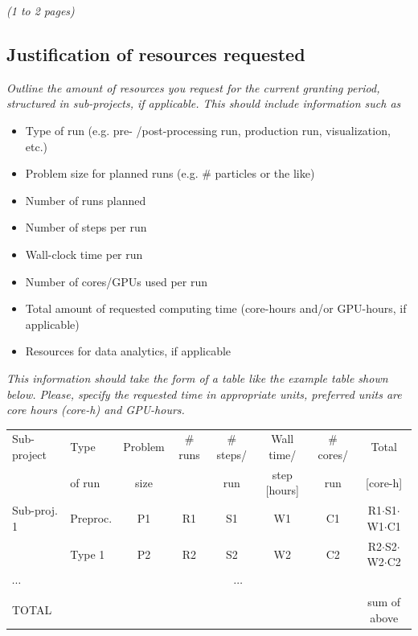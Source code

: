 \documentclass [a4paper, 12pt]{article}
\begin{document}
\textit{(1 to 2 pages)}
\newpage
\subsection{Justification of resources requested}
\textit{Outline the amount of resources you request for the current granting period, structured in sub-projects, if applicable. This should include information such as}
\begin{itshape}
\begin{itemize}\setlength{\itemsep}{-2pt}
    \item Type of run (e.g. pre- /post-processing run, production run, visualization, etc.)
    \item Problem size for planned runs (e.g. \# particles or the like)
    \item Number of runs planned
    \item Number of steps per run
    \item Wall-clock time per run
    \item Number of cores/GPUs used per run
    \item Total amount of requested computing time (core-hours and/or GPU-hours, if applicable)
    \item Resources for data analytics, if applicable
\end{itemize}
\end{itshape}
\textit{This information should take the form of a table like the example table shown below. Please, specify the requested time in appropriate units, preferred units are core hours (core-h) and GPU-hours.}\\



\begin{tabular}{llcccccc} \hline\hline
  Sub-project & 
  Type &
  Problem & 
  \# runs & 
  \# steps/ & 
  Wall time/ & 
  \# cores/ & 
  Total \\
  &
  of run &
  size  &
  &
  run &
  step [hours] &
  run &
  [core-h] \\
 \hline\hline
  Sub-proj. 1 & 
  Preproc. &
  P1 & 
  R1 & 
  S1 &
  W1 &
  C1 &
  R1$\cdot$S1$\cdot$W1$\cdot$C1 \\
   ~     &
  Type 1 &
  P2 & 
  R2 & 
  S2 &
  W2 &
  C2 &
  R2$\cdot$S2$\cdot$W2$\cdot$C2 \\
$\cdots$ &\multicolumn{7}{c}{$\cdots$}\\
\hline\hline
TOTAL & & & & & & & sum of above\\
\end{tabular}
\bigskip
\end{document}
